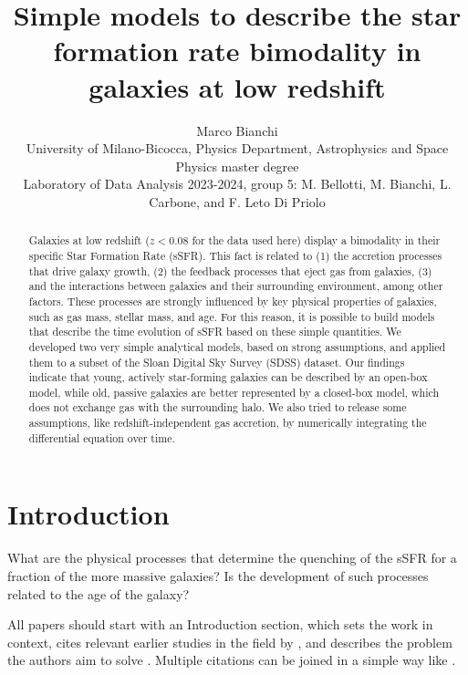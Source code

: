 \documentclass[fleqn,usenatbib]{mnras}
\title[Short title, max. 45 characters]{Simple models to describe the star formation rate bimodality in galaxies at low redshift}
\author[M. Bianchi]{
Marco Bianchi
\\
University of Milano-Bicocca, Physics Department, Astrophysics and Space Physics master degree\\
Laboratory of Data Analysis 2023-2024, group 5: M. Bellotti, M. Bianchi, L. Carbone, and F. Leto Di Priolo\\
}
\begin{document}
\label{firstpage}
\pagerange{\pageref{firstpage}--\pageref{lastpage}}
\maketitle

\begin{abstract}
Galaxies at low redshift ($z<0.08$ for the data used here) display a bimodality in their specific Star Formation Rate (sSFR). This fact is related to (1) the accretion processes that drive galaxy growth, (2) the feedback processes that eject gas from galaxies, (3) and the interactions between galaxies and their surrounding environment, among other factors. These processes are strongly influenced by key physical properties of galaxies, such as gas mass, stellar mass, and age. For this reason, it is possible to build models that describe the time evolution of sSFR based on these simple quantities. We developed two very simple analytical models, based on strong assumptions, and applied them to a subset of the Sloan Digital Sky Survey (SDSS) dataset. Our findings indicate that young, actively star-forming galaxies can be described by an open-box model, while old, passive galaxies are better represented by a closed-box model, which does not exchange gas with the surrounding halo. We also tried to release some assumptions, like redshift-independent gas accretion, by numerically integrating the differential equation over time.
\bigskip
\end{abstract} 





\section{Introduction}

What are the physical processes that determine the quenching of the sSFR for a fraction of the more massive galaxies? 
Is the development of such processes related to the age of the galaxy?

All papers should start with an Introduction section, which sets the work
in context, cites relevant earlier studies in the field by \citet{Fournier1901},
and describes the problem the authors aim to solve \citep[e.g.][]{vanDijk1902}.
Multiple citations can be joined in a simple way like \citet{deLaguarde1903, delaGuarde1904}.
\end{document}
